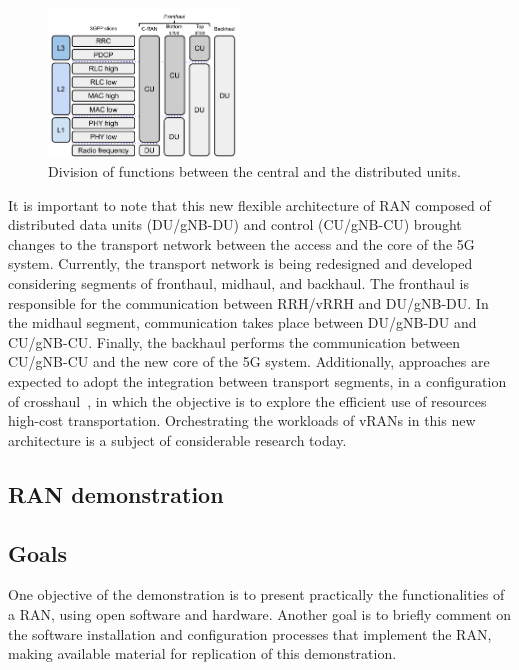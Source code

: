 \begin{figure}[htb]
 \begin{center}
\includegraphics[width=0.45\textwidth]{figs/splits_layers.pdf}
  \end{center}
\caption{Division of functions between the central and the distributed units.}
\label{fig:splitsLayers}
\end{figure}

It is important to note that this new flexible architecture of RAN composed of distributed data units (DU/gNB-DU) and control (CU/gNB-CU) brought changes to the transport network between the access and the core of the 5G system. Currently, the transport network is being redesigned and developed considering segments of fronthaul, midhaul, and backhaul. The fronthaul is responsible for the communication between RRH/vRRH and DU/gNB-DU. In the midhaul segment, communication takes place between DU/gNB-DU and CU/gNB-CU. Finally, the backhaul performs the communication between CU/gNB-CU and the new core of the 5G system. Additionally, approaches are expected to adopt the integration between transport segments, in a configuration of crosshaul~\cite {Gonzalez-Diaz:19,fonseca-sbrc-2019}, in which the objective is to explore the efficient use of resources high-cost transportation. Orchestrating the workloads of vRANs in this new architecture is a subject of considerable research today.

\subsection{RAN demonstration} \label{subsec:demo_RAN}

\subsection*{Goals}

One objective of the demonstration is to present practically the functionalities of a RAN, using open software and hardware. Another goal is to briefly comment on the software installation and configuration processes that implement the RAN, making available material for replication of this demonstration.

